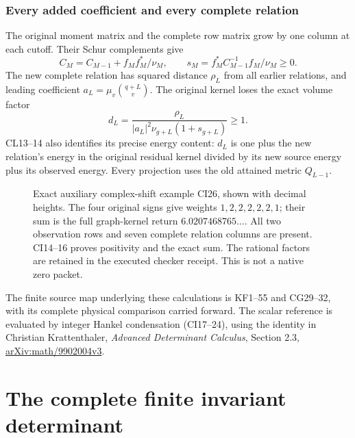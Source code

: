 \documentclass[11pt]{article}
\begin{document}
\section*{Every added coefficient and every complete relation}
The original moment matrix and the complete row matrix grow by one
column at each cutoff. Their Schur complements give
\[
C_M=C_{M-1}+f_Mf_M^*/\nu_M,\qquad
s_M=f_M^*C_{M-1}^{-1}f_M/\nu_M\ge0.
\]
The new complete relation has squared distance $\rho_L$ from all earlier
relations, and leading coefficient $a_L=\mu_v\binom{q+L}{v}$.
The original kernel loses the exact volume factor
\[
d_L=\frac{\rho_L}{|a_L|^2\nu_{g+L}(1+s_{g+L})}\ge1.
\]
CL13--14 also identifies its precise energy content: $d_L$ is one plus
the new relation's energy in the original residual kernel divided by
its new source energy plus its observed energy. Every projection uses
the old attained metric $Q_{L-1}$.
\begin{figure}[ht]\centering
{}
\caption{Exact auxiliary complex-shift example CI26, shown with
decimal heights. The four original signs give weights $1,2,2,2,2,2,1$;
their sum is the full graph-kernel return $6.0207468765\ldots$.
All two observation rows and seven complete relation columns are present.
CI14--16 proves positivity and the exact sum. The rational factors are
retained in the executed checker receipt. This is not a native zero packet.}
\end{figure}
The finite source map underlying these calculations is KF1--55 and
CG29--32, with its complete physical comparison carried forward.
The scalar reference is evaluated by integer Hankel condensation
(CI17--24), using the identity in Christian Krattenthaler,
\emph{Advanced Determinant Calculus}, Section 2.3,
\href{https://arxiv.org/abs/math/9902004v3}{arXiv:math/9902004v3}.
\clearpage

\clearpage\part{The complete finite invariant determinant}
\end{document}

